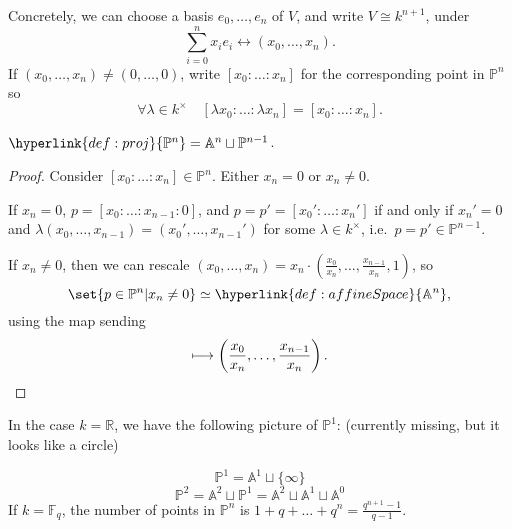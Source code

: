 \documentclass{article}
\newcommand{\A}{\mathbb{A}}
\newcommand{\F}{\mathbb{F}}
\begin{document}
Concretely, we can choose a basis $e_0, \dotsc, e_n$ of $V$, and write $V \cong  k^{n+1}$, under \begin{equation*}\sum_{i=0}^n x_i e_i \longleftrightarrow (x_0, \dotsc, x_n).\end{equation*}
If $(x_0, \dotsc, x_n) \neq (0, \dotsc, 0)$, write $[x_0: \dotsc: x_n]$ for the corresponding point in $\mathbb{P}^n$ so
\begin{equation*}\forall \lambda \in k^\times \quad [\lambda x_0: \dotsc: \lambda x_n] = [x_0: \dotsc : x_n].\end{equation*}

\begin{lemma}
    $\hyperlink{def:proj}{\mathbb{P}^n} = \A^n \sqcup \mathbb{P}^{n-1}$.
\end{lemma}
\begin{proof}
    Consider $[x_0 : \dotsc : x_n] \in \mathbb{P}^n$. Either $x_n = 0$ or $x_n \neq 0$.

    If $x_n = 0$, $p = [x_0 : \dotsc : x_{n-1} : 0]$, and $p = p' = [x_0' : \dotsc : x_n']$ if and only if $x_n' =0$ and $\lambda(x_0, \dotsc, x_{n-1}) = (x_0', \dotsc, x_{n-1}')$ for some $\lambda \in k^\times$, i.e.\ $p = p' \in \mathbb{P}^{n-1}$.

    If $x_n \neq 0$, then we can rescale $(x_0, \dotsc, x_n) = x_n \cdot (\frac{x_0}{x_n}, \dotsc, \frac{x_{n-1}}{x_n}, 1)$, so
    \begin{equation*}\set{p \in \mathbb{P}^n | x_n \neq 0} \simeq \hyperlink{def:affineSpace}{\A^n},\end{equation*}
    using the map sending
    \begin{equation*}[x_0 : \dotsc : x_n] \longmapsto \left(\frac{x_0}{x_n}, \dotsc, \frac{x_{n-1}}{x_n}\right).\qedhere\end{equation*}
\end{proof}
\begin{eg}
    In the case $k= \mathbb{R}$, we have the following picture of \hyperlink{def:proj}{$\mathbb{P}^1$}: (currently missing, but it looks like a circle)

    \begin{equation*}\mathbb{P}^1 = \A^1 \sqcup \{\infty\}\end{equation*}
    \begin{equation*}
        \mathbb{P}^2 = \A^2 \sqcup \mathbb{P}^1 = \A^2 \sqcup \A^1 \sqcup \A^0
    \end{equation*}
    If $k = \F_q$, the number of points in $\mathbb{P}^n$ is $1 + q + \dotsc + q^n = \frac{q^{n+1}-1}{q-1}$.
\end{eg}
\end{document}

